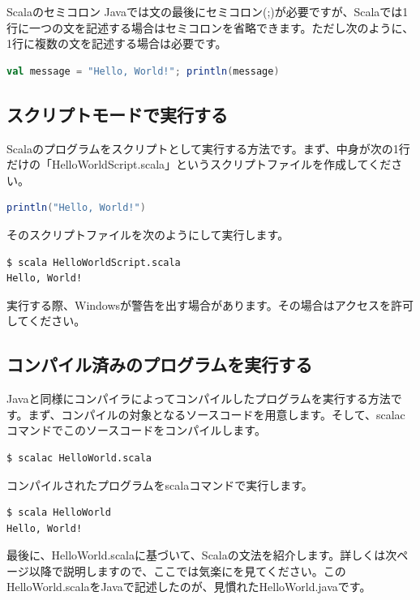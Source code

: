 \begin{itembox}[l]{Scalaのセミコロン}
Javaでは文の最後にセミコロン(;)が必要ですが、Scalaでは1行に一つの文を記述する場合はセミコロンを省略できます。ただし次のように、1行に複数の文を記述する場合は必要です。
\begin{lstlisting}[language=scala, frame=none]
val message = "Hello, World!"; println(message)
\end{lstlisting}
\end{itembox}

\subsection{スクリプトモードで実行する}
Scalaのプログラムをスクリプトとして実行する方法です。まず、中身が次の1行だけの「HelloWorldScript.scala」というスクリプトファイルを作成してください。
\begin{lstlisting}[language=scala, frame=none]
println("Hello, World!")
\end{lstlisting}
そのスクリプトファイルを次のようにして実行します。
\begin{lstlisting}[language=bash, frame=none]
$ scala HelloWorldScript.scala
Hello, World!
\end{lstlisting}
実行する際、Windowsが警告を出す場合があります。その場合はアクセスを許可してください。

\subsection{コンパイル済みのプログラムを実行する}
Javaと同様にコンパイラによってコンパイルしたプログラムを実行する方法です。まず、コンパイルの対象となるソースコードを用意します。そして、scalacコマンドでこのソースコードをコンパイルします。
\begin{lstlisting}[language=bash, frame=none]
$ scalac HelloWorld.scala
\end{lstlisting}
コンパイルされたプログラムをscalaコマンドで実行します。
\begin{lstlisting}[language=bash, frame=none]
$ scala HelloWorld
Hello, World!
\end{lstlisting}
最後に、HelloWorld.scalaに基づいて、Scalaの文法を紹介します。詳しくは次ページ以降で説明しますので、ここでは気楽にを見てください。このHelloWorld.scalaをJavaで記述したのが、見慣れたHelloWorld.javaです。


